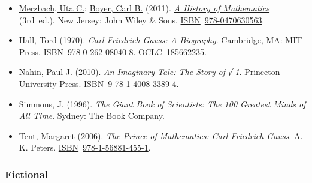 \begin{itemize}
\tightlist
\item
  \href{https://en.wikipedia.org/wiki/Uta_Merzbach}{Merzbach, Uta C.}; \href{https://en.wikipedia.org/wiki/Carl_Benjamin_Boyer}{Boyer, Carl B.} (2011). \href{https://books.google.com/books?id=bR9HAAAAQBAJ}{\emph{A History of Mathematics}} (3rd{~}ed.). New Jersey: John Wiley \& Sons. \href{https://en.wikipedia.org/wiki/ISBN_(identifier)}{ISBN}{~}\href{https://en.wikipedia.org/wiki/Special:BookSources/978-0470630563}{978-0470630563}.{}
\item
  \href{https://en.wikipedia.org/wiki/Tord_Hall}{Hall, Tord} (1970). \href{https://archive.org/details/carlfriedrichgau00tord}{\emph{Carl Friedrich Gauss: A Biography}}. Cambridge, MA: \href{https://en.wikipedia.org/wiki/MIT_Press}{MIT Press}. \href{https://en.wikipedia.org/wiki/ISBN_(identifier)}{ISBN}{~}\href{https://en.wikipedia.org/wiki/Special:BookSources/978-0-262-08040-8}{978-0-262-08040-8}. \href{https://en.wikipedia.org/wiki/OCLC_(identifier)}{OCLC}{~}\href{https://search.worldcat.org/oclc/185662235}{185662235}.{}
\item
  \href{https://en.wikipedia.org/wiki/Paul_J._Nahin}{Nahin, Paul J.} (2010). \href{https://books.google.com/books?id=OPyPwaElDvUC&pg=PA82}{\emph{An Imaginary Tale: The Story of √-1}}. Princeton University Press. \href{https://en.wikipedia.org/wiki/ISBN_(identifier)}{ISBN}{~}\href{https://en.wikipedia.org/wiki/Special:BookSources/9_78-1-4008-3389-4}{9 78-1-4008-3389-4}.{}
\item
  Simmons, J. (1996). \emph{The Giant Book of Scientists: The 100 Greatest Minds of All Time}. Sydney: The Book Company.{}
\item
  Tent, Margaret (2006). \emph{The Prince of Mathematics: Carl Friedrich Gauss}. A. K. Peters. \href{https://en.wikipedia.org/wiki/ISBN_(identifier)}{ISBN}{~}\href{https://en.wikipedia.org/wiki/Special:BookSources/978-1-56881-455-1}{978-1-56881-455-1}.{}
\end{itemize}


\subsubsection{Fictional}\label{Fictional}

